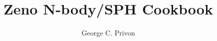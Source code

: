 \documentclass[11pt,letterpaper]{article}
\begin{document}
\title{Zeno N-body/SPH Cookbook}
\author{George C. Privon}

\maketitle










\end{document}
